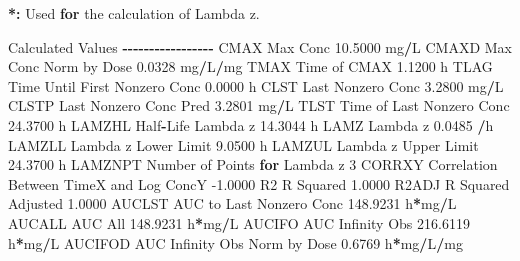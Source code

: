 \documentclass[
  10pt,
]{krantz}
\makeatletter
\newenvironment{Shaded}{\begin{snugshade}}{\end{snugshade}}
\newcommand{\ControlFlowTok}[1]{\textcolor[rgb]{0.13,0.29,0.53}{\textbf{#1}}}
\newcommand{\DecValTok}[1]{\textcolor[rgb]{0.00,0.00,0.81}{#1}}
\newcommand{\ErrorTok}[1]{\textcolor[rgb]{0.64,0.00,0.00}{\textbf{#1}}}
\newcommand{\FloatTok}[1]{\textcolor[rgb]{0.00,0.00,0.81}{#1}}
\newcommand{\NormalTok}[1]{#1}
\newcommand{\OperatorTok}[1]{\textcolor[rgb]{0.81,0.36,0.00}{\textbf{#1}}}
\newcommand{\StringTok}[1]{\textcolor[rgb]{0.31,0.60,0.02}{#1}}
\newenvironment{kframe}{%
\medskip{}
\setlength{\fboxsep}{.8em}
 \def\at@end@of@kframe{}%
 \ifinner\ifhmode%
  \def\at@end@of@kframe{\end{minipage}}%
  \begin{minipage}{\columnwidth}%
 \fi\fi%
 \def\FrameCommand##1{\hskip\@totalleftmargin \hskip-\fboxsep
 \colorbox{shadecolor}{##1}\hskip-\fboxsep
     \hskip-\linewidth \hskip-\@totalleftmargin \hskip\columnwidth}%
 \MakeFramed {\advance\hsize-\width
   \@totalleftmargin\z@ \linewidth\hsize
   \@setminipage}}%
 {\par\unskip\endMakeFramed%
 \at@end@of@kframe}
\renewenvironment{Shaded}{\begin{kframe}}{\end{kframe}}
\makeatother
\begin{document}
\begin{Shaded}
\begin{Highlighting}[]
\OperatorTok{*}\ErrorTok{:}\StringTok{ }\NormalTok{Used }\ControlFlowTok{for}\NormalTok{ the calculation of Lambda z.}


\NormalTok{Calculated Values}
\OperatorTok{{-}{-}{-}{-}{-}{-}{-}{-}{-}{-}{-}{-}{-}{-}{-}{-}{-}}
\NormalTok{CMAX       Max Conc                                       }\FloatTok{10.5000}\NormalTok{ mg}\OperatorTok{/}\NormalTok{L}
\NormalTok{CMAXD      Max Conc Norm by Dose                           }\FloatTok{0.0328}\NormalTok{ mg}\OperatorTok{/}\NormalTok{L}\OperatorTok{/}\NormalTok{mg}
\NormalTok{TMAX       Time of CMAX                                    }\FloatTok{1.1200}\NormalTok{ h}
\NormalTok{TLAG       Time Until First Nonzero Conc                   }\FloatTok{0.0000}\NormalTok{ h}
\NormalTok{CLST       Last Nonzero Conc                               }\FloatTok{3.2800}\NormalTok{ mg}\OperatorTok{/}\NormalTok{L}
\NormalTok{CLSTP      Last Nonzero Conc Pred                          }\FloatTok{3.2801}\NormalTok{ mg}\OperatorTok{/}\NormalTok{L}
\NormalTok{TLST       Time of Last Nonzero Conc                      }\FloatTok{24.3700}\NormalTok{ h}
\NormalTok{LAMZHL     Half}\OperatorTok{{-}}\NormalTok{Life Lambda z                             }\FloatTok{14.3044}\NormalTok{ h}
\NormalTok{LAMZ       Lambda z                                        }\FloatTok{0.0485} \OperatorTok{/}\NormalTok{h}
\NormalTok{LAMZLL     Lambda z Lower Limit                            }\FloatTok{9.0500}\NormalTok{ h}
\NormalTok{LAMZUL     Lambda z Upper Limit                           }\FloatTok{24.3700}\NormalTok{ h}
\NormalTok{LAMZNPT    Number of Points }\ControlFlowTok{for}\NormalTok{ Lambda z                   }\DecValTok{3}
\NormalTok{CORRXY     Correlation Between TimeX and Log ConcY        }\FloatTok{{-}1.0000} 
\NormalTok{R2         R Squared                                       }\FloatTok{1.0000} 
\NormalTok{R2ADJ      R Squared Adjusted                              }\FloatTok{1.0000} 
\NormalTok{AUCLST     AUC to Last Nonzero Conc                      }\FloatTok{148.9231}\NormalTok{ h}\OperatorTok{*}\NormalTok{mg}\OperatorTok{/}\NormalTok{L}
\NormalTok{AUCALL     AUC All                                       }\FloatTok{148.9231}\NormalTok{ h}\OperatorTok{*}\NormalTok{mg}\OperatorTok{/}\NormalTok{L}
\NormalTok{AUCIFO     AUC Infinity Obs                              }\FloatTok{216.6119}\NormalTok{ h}\OperatorTok{*}\NormalTok{mg}\OperatorTok{/}\NormalTok{L}
\NormalTok{AUCIFOD    AUC Infinity Obs Norm by Dose                   }\FloatTok{0.6769}\NormalTok{ h}\OperatorTok{*}\NormalTok{mg}\OperatorTok{/}\NormalTok{L}\OperatorTok{/}\NormalTok{mg}

\end{Highlighting}
\end{Shaded}
\end{document}
